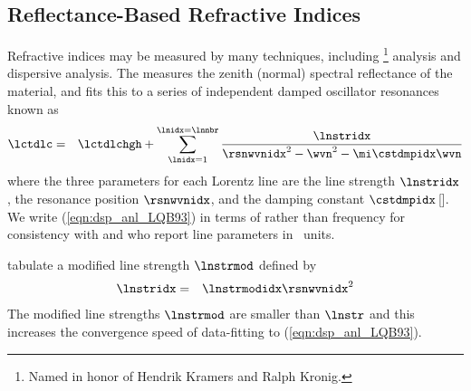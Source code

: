 \documentclass[12pt,twoside]{book}
\begin{document}
\subsection[Reflectance-Based Refractive Indices]{Reflectance-Based Refractive Indices}\label{sxn:rfl}
Refractive indices may be measured by many techniques, including 
\footnote{Named in honor of Hendrik Kramers and
  Ralph Kronig.} analysis and dispersive analysis.
The  measures the zenith (normal)
spectral reflectance of the material, and fits this to a series of
independent damped oscillator resonances known as 
 \cite[][]{QOL78,LQB93}
\begin{eqnarray}
\lctdlc & = & \lctdlchgh + \sum_{\lnidx=1}^{\lnidx=\lnnbr} 
\frac{\lnstridx}{\rsnwvnidx^{2} - \wvn^{2} - \mi\cstdmpidx\wvn}
\label{eqn:dsp_anl_LQB93}
\end{eqnarray}
where the three parameters for each Lorentz line are the line strength
$\lnstridx$, the resonance position $\rsnwvnidx$, and the damping
constant $\cstdmpidx$\,[\xcm].
We write (\ref{eqn:dsp_anl_LQB93}) in terms of  rather
than frequency for consistency with \cite{QOL78} and \cite{LQB93} who
report line parameters in \xcm\ units.

\cite{LQB93} tabulate a modified line strength $\lnstrmod$ defined by
\begin{eqnarray}
\lnstridx & = & \lnstrmodidx \rsnwvnidx^{2} 
\label{eqn:ln_str_mod_dfn}
\end{eqnarray}
The modified line strengths $\lnstrmod$ are smaller than $\lnstr$ and
this increases the convergence speed of data-fitting to
(\ref{eqn:dsp_anl_LQB93}). 
\end{document}
